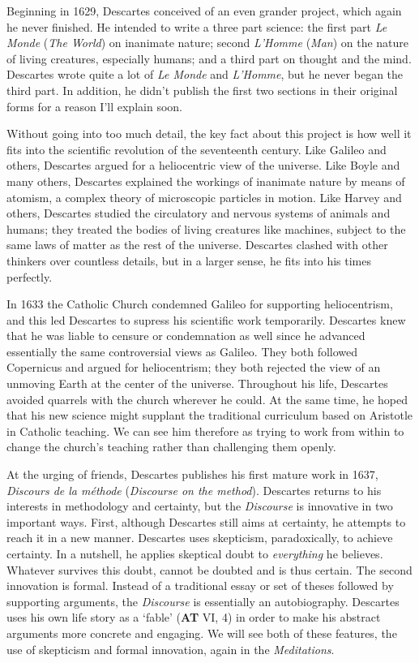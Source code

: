 Beginning in 1629, Descartes conceived of an even grander project, which again he never finished. He intended to write a three part science: the first part \textit{Le Monde} (\textit{The World}) on inanimate nature; second \textit{L'Homme} (\textit{Man}) on the nature of living creatures, especially humans; and a third part on thought and the mind. Descartes wrote quite a lot of \textit{Le Monde} and \textit{L'Homme}, but he never began the third part. In addition, he didn't publish the first two sections in their original forms for a reason I'll explain soon.

Without going into too much detail, the key fact about this project is how well it fits into the scientific revolution of the seventeenth century. Like Galileo and others, Descartes argued for a heliocentric view of the universe. Like Boyle and many others, Descartes explained the workings of inanimate nature by means of atomism, a complex theory of microscopic particles in motion. Like Harvey and others, Descartes studied the circulatory and nervous systems of animals and humans; they treated the bodies of living creatures like machines, subject to the same laws of matter as the rest of the universe. Descartes clashed with other thinkers over countless details, but in a larger sense, he fits into his times perfectly.

In 1633 the Catholic Church condemned Galileo for supporting heliocentrism, and this led Descartes to supress his scientific work temporarily. Descartes knew that he was liable to censure or condemnation as well since he advanced essentially the same controversial views as Galileo. They both followed Copernicus and argued for heliocentrism; they both rejected the view of an unmoving Earth at the center of the universe. Throughout his life, Descartes avoided quarrels with the church wherever he could. At the same time, he hoped that his new science might supplant the traditional curriculum based on Aristotle in Catholic teaching. We can see him therefore as trying to work from within to change the church's teaching rather than challenging them openly.

At the urging of friends, Descartes publishes his first mature work in 1637, \textit{Discours de la méthode} (\textit{Discourse on the method}). Descartes returns to his interests in methodology and certainty, but the \textit{Discourse} is innovative in two important ways. First, although Descartes still aims at certainty, he attempts to reach it in a new manner. Descartes uses skepticism, paradoxically, to achieve certainty. In a nutshell, he applies skeptical doubt to \textit{everything} he believes. Whatever survives this doubt, cannot be doubted and is thus certain. The second innovation is formal. Instead of a traditional essay or set of theses followed by supporting arguments, the \textit{Discourse} is essentially an autobiography. Descartes uses his own life story as a `fable' (\textbf{AT} VI, 4) in order to make his abstract arguments more concrete and engaging. We will see both of these features, the use of skepticism and formal innovation, again in the \textit{Meditations}.

